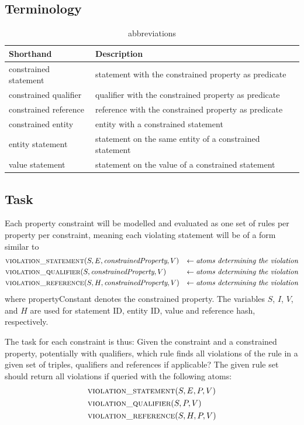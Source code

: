 \documentclass[hyperref,bachelorofscience,fleqn]{cgvpub}
\begin{document}
\subsection{Terminology}
\begin{table}[H]
\caption{abbreviations}\label{tab_abbreviations}
\begin{tabular}{ll}
Shorthand & Description \\
\hline
constrained statement & statement with the constrained property as predicate \\
constrained qualifier & qualifier with the constrained property as predicate \\
constrained reference & reference with the constrained property as predicate \\
constrained entity & entity with a constrained statement \\
entity statement & statement on the same entity of a constrained statement \\
value statement & statement on the value of a constrained statement
\end{tabular}
\end{table}

\subsection{Task}\label{subsec_task}
Each property constraint will be modelled and evaluated as one set of rules per property per constraint, meaning each violating statement will be of a form similar to
\begin{align*}
&\textsc{violation\_statement}(S, E, \emph{constrainedProperty}, V) &\leftarrow \emph{atoms determining the violation} \\
&\textsc{violation\_qualifier}(S, \emph{constrainedProperty}, V) &\leftarrow \emph{atoms determining the violation} \\
&\textsc{violation\_reference}(S, H, \emph{constrainedProperty}, V) &\leftarrow \emph{atoms determining the violation}
\end{align*}
where propertyConstant denotes the constrained property. The variables \(S\), \(I\), \(V\), and \(H\) are used for statement ID, entity ID, value and reference hash, respectively.

The task for each constraint is thus: Given the constraint and a constrained property, potentially with qualifiers, which rule finds all violations of the rule in a given set of triples, qualifiers and references if applicable? The given rule set should return all violations if queried with the following atoms:
\begin{align*}
&\textsc{violation\_statement}(S, E, P, V) \\
&\textsc{violation\_qualifier}(S, P, V) \\
&\textsc{violation\_reference}(S, H, P, V)
\end{align*}
\end{document}
